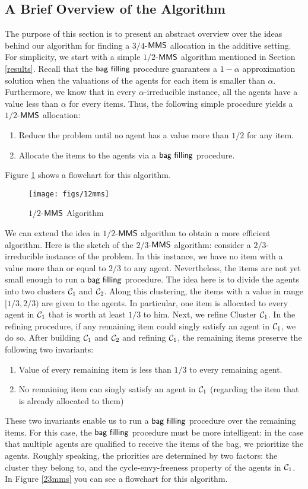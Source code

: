 \subsection{A Brief Overview of the Algorithm}\label{overview}
The purpose of this section is to present an abstract overview over the ideas behind our algorithm for finding a $3/4$-$\mathsf{MMS}$ allocation in the additive setting. For simplicity, we start with a simple $1/2$-$\mathsf{MMS}$ algorithm mentioned in Section \ref{results}. Recall that the $\textsf{bag filling}$ procedure guarantees a $1-\alpha$ approximation solution when the valuations of the agents for each item is smaller than $\alpha$. Furthermore, we know that in every $\alpha$-irreducible instance, all the agents have a value less than $\alpha$ for every items. Thus, the following simple procedure yields a $1/2$-$\mathsf{MMS}$ allocation:
\begin{enumerate}
\item Reduce the problem until no agent has a value more than $1/2$ for any item.
\item Allocate the items to the agents via a $\textsf{bag filling}$ procedure.
\end{enumerate} 

Figure \ref{fig:mms12} shows a flowchart for this algorithm. 
\begin{figure}[h]
\centerline{
\texttt{[image: figs/12mms]}
}
\caption{$1/2$-$\mathsf{MMS}$ Algorithm}
\label{fig:mms12}
\end{figure}

We can extend the idea in $1/2$-$\mathsf{MMS}$ algorithm to obtain a more efficient algorithm. Here is the sketch of the $2/3$-$\mathsf{MMS}$ algorithm:
consider a $2/3$-irreducible instance of the problem. In this instance, we have no item with a value more than or equal to $2/3$ to any agent. Nevertheless, the items are not yet small enough to run a $\textsf{bag filling}$ procedure. The idea here is to divide the agents into two clusters $\mathcal{C}_1$ and $\mathcal{C}_2$. Along this clustering, the items with a value  in range $[1/3,2/3)$ are given to the agents. In particular, one item is allocated to every agent in $\mathcal{C}_1$ that is worth at least $1/3$ to him. 
Next, we refine Cluster $\mathcal{C}_1$. In the refining procedure, if any remaining item could singly satisfy an agent in $\mathcal{C}_1$, we do so. After building $\mathcal{C}_1$ and $\mathcal{C}_2$ and refining $\mathcal{C}_1$, the remaining items preserve the following two invariants:
\begin{enumerate}
\item Value of every remaining item is less than $1/3$ to every remaining agent.
\item  No remaining item can singly satisfy an agent in $\mathcal{C}_1$ (regarding the item that is already allocated to them)
\end{enumerate} 
These two invariants enable us to run a $\textsf{bag filling}$ procedure over the remaining items. For this case, the $\textsf{bag filling}$ procedure must be more intelligent: in the case that multiple agents are qualified to receive the items of the bag, we prioritize the agents. Roughly speaking, the priorities are determined by two factors: the cluster they belong to, and the cycle-envy-freeness property of the agents in $\mathcal{C}_1$. In Figure \ref{23mms} you can see a flowchart for this algorithm. 


